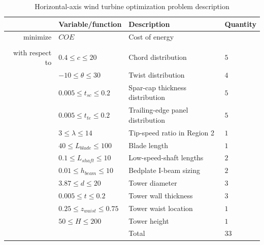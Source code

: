 \documentclass[]{aiaa-tc} %
\begin{document}
    \begin{table}[!htb]
        \centering
        \caption{Horizontal-axis wind turbine optimization problem description}
        \begin{tabular}{r l l l}
            \toprule
            & Variable/function & Description & Quantity \\
            \midrule
            minimize            & $COE$ & Cost of energy \\
            \\
            with respect to & $0.4 \le c \le 20$ & Chord distribution & $5$ \\
                                    & $-10 \le \theta \le 30$ & Twist distribution & $4$ \\
                                    & $0.005 \le t_{sc} \le 0.2$ & Spar-cap thickness distribution & $5$ \\
                                    & $0.005 \le t_{te} \le 0.2$ & Trailing-edge panel distribution & $5$ \\
                                    & $3 \le \lambda \le 14$ & Tip-speed ratio in Region 2 & $1$ \\
                                    & $40 \le L_{blade} \le 100$ & Blade length & $1$ \\
                                    & $0.1 \le L_{shaft} \le 10$ & Low-speed-shaft lengths & $2$ \\
                                    & $0.01 \le h_{beam} \le 10$ & Bedplate I-beam sizing & $2$ \\
                                    & $3.87 \le d \le 20$ & Tower diameter & $3$ \\
                                    & $0.005 \le t \le 0.2$ & Tower wall thickness & $3$ \\
                                    & $0.25 \le z_{waist} \le 0.75$ & Tower waist location & $1$ \\
                                    & $50 \le H \le 200$ & Tower height & $1$ \\
                                    & & Total & $33$ \\


\end{tabular}
\end{table}
\end{document}
